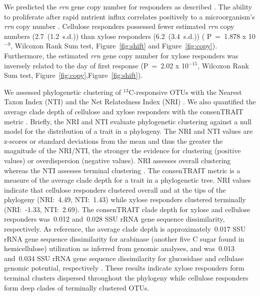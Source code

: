We predicted the \textit{rrn} gene copy number for responders as described
\citep{Kembel_2012}. The ability to proliferate after rapid nutrient
influx correlates positively to a microorganism's \textit{rrn} copy number
\citep{Klappenbach_2000}. Cellulose responders possessed fewer estimated
\textit{rrn} copy numbers (2.7~(1.2~s.d.)) than xylose responders
(6.2~(3.4~s.d.)) ( P~=~1.878 x 10$^{-9}$, Wilcoxon Rank Sum test,
Figure~\ref{fig:shift} and Figure~\ref{fig:copy}). Furthermore, the
estimated \textit{rrn} gene copy number for xylose responders was
inversely related to the day of first response (P~=~2.02 x 10$^{-15}$,
Wilcoxon Rank Sum test, Figure~\ref{fig:copy},Figure~\ref{fig:shift}).

We assessed phylogenetic clustering of $^{13}$C-responsive OTUs with the
Nearest Taxon Index (NTI) and the Net Relatedness Index (NRI)
\citep{Webb2000}. We also quantified the average clade depth of cellulose and
xylose responders with the consenTRAIT metric \citep{Martiny2013}. Briefly, the
NRI and NTI evaluate phylogenetic clustering against a null model for the
distribution of a trait in a phylogeny. The NRI and NTI values are z-scores or
standard deviations from the mean and thus the greater the magnitude of the
NRI/NTI, the stronger the evidence for clustering (positive values) or
overdispersion (negative values). NRI assesses overall clustering whereas the
NTI assesses terminal clustering \citep{Evans2014a}. The consenTRAIT metric is
a measure of the average clade depth for a trait in a phylogenetic tree. NRI
values indicate that cellulose responders clustered overall and at the tips of
the phylogeny (NRI:~4.49, NTI:~1.43) while xylose responders clustered
terminally (NRI:~-1.33, NTI:~2.69). The consenTRAIT clade depth for xylose and
cellulose responders was~0.012 and~0.028 SSU rRNA gene sequence dissimilarity,
respectively. As reference, the average clade depth is approximately~0.017 SSU
rRNA gene sequence dissimilarity for arabinase (another five C sugar found in
hemicellulose) utilization as inferred from genomic analyses, and was~0.013
and~0.034 SSU rRNA gene sequence dissimilarity for glucosidase and cellulase
genomic potential, respectively \citep{Martiny2013,Berlemont2013}. These
results indicate xylose responders form terminal clusters dispersed throughout
the phylogeny while cellulose responders form deep clades of terminally
clustered OTUs.
